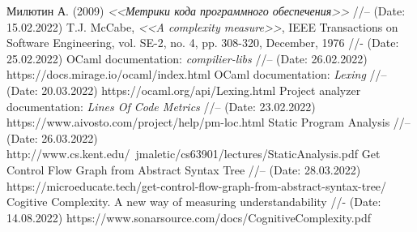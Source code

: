 \newpage 
\begin{thebibliography}{9}
Милютин А. (2009) \emph{<<Метрики кода программного обеспечения>>} //-- (Date: 15.02.2022)
T.J. McCabe, \emph{<<A complexity measure>>}, IEEE Transactions on
Software Engineering, vol. SE-2, no. 4, pp. 308-320, December,
1976 //- (Date: 25.02.2022)
 OCaml documentation: \emph{compilier-libs} //-- (Date: 26.02.2022) https://docs.mirage.io/ocaml/index.html
 OCaml documentation: \emph{Lexing} //-- (Date: 20.03.2022)
https://ocaml.org/api/Lexing.html
 Project analyzer documentation: \emph{Lines Of Code Metrics} //-- (Date: 23.02.2022) https://www.aivosto.com/project/help/pm-loc.html
 Static Program Analysis //-- (Date: 26.03.2022)
http://www.cs.kent.edu/~jmaletic/cs63901/lectures/StaticAnalysis.pdf
 Get Control Flow Graph from Abstract Syntax Tree //-- (Date: 28.03.2022)
https://microeducate.tech/get-control-flow-graph-from-abstract-syntax-tree/
 Cogitive Complexity. A new way of measuring understandability 
//- (Date: 14.08.2022) https://www.sonarsource.com/docs/CognitiveComplexity.pdf
\end{thebibliography}
